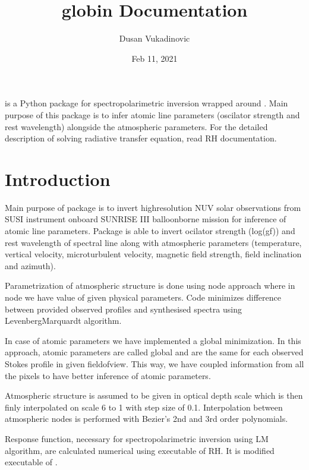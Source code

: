 \documentclass[letterpaper,10pt,english]{sphinxmanual}
\title{globin Documentation}
\date{Feb 11, 2021}
\author{Dusan Vukadinovic}
\begin{document}
\pagestyle{empty}
\sphinxmaketitle
\pagestyle{plain}
\sphinxtableofcontents
\pagestyle{normal}
\label{\detokenize{index::doc}}


 is a Python package for spectropolarimetric inversion wrapped around  . Main purpose of this package is to infer atomic line parameters (oscilator strength and rest wavelength) alongside
the atmospheric parameters. For the detailed description of solving radiative transfer equation, read RH documentation.


\chapter{Introduction}
\label{\detokenize{user/introduction:introduction}}\label{\detokenize{user/introduction:intro}}\label{\detokenize{user/introduction::doc}}
Main purpose of  package is to invert high\sphinxhyphen{}resolution NUV solar observations from SUSI instrument onboard SUNRISE III balloon\sphinxhyphen{}borne mission for inference of atomic line parameters. Package is able to invert ocilator strength (log(gf)) and rest wavelength of spectral line along with atmospheric parameters (temperature, vertical velocity, micro\sphinxhyphen{}turbulent velocity, magnetic field strength, field inclination and azimuth).

Parametrization of atmospheric structure is done using node approach where in node we have value of given physical parameters. Code minimizes difference between provided observed profiles and synthesised spectra using Levenberg\sphinxhyphen{}Marquardt algorithm.

In case of atomic parameters we have implemented a global minimization. In this approach, atomic parameters are called global and are the same for each observed Stokes profile in given field\sphinxhyphen{}of\sphinxhyphen{}view. This way, we have coupled information from all the pixels to have better inference of atomic parameters.

Atmospheric structure is assumed to be given in optical depth scale which is then finly interpolated on scale \sphinxhyphen{}6 to 1 with step size of 0.1. Interpolation between atmospheric nodes is performed with Bezier’s 2nd and 3rd order polynomials.

Response function, necessary for spectropolarimetric inversion using LM algorithm, are calculated numerical using  executable of RH. It is modified executable of .
\end{document}
